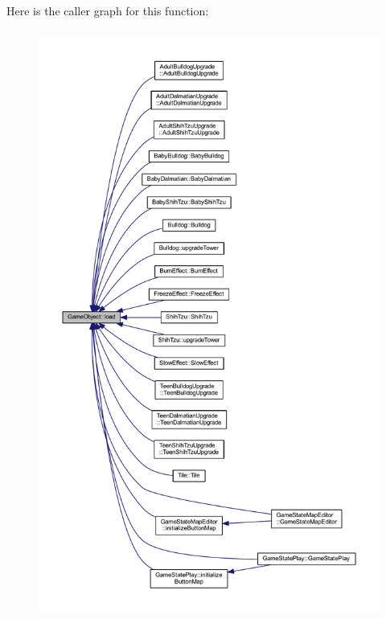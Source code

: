 Here is the caller graph for this function\+:
\nopagebreak
\begin{figure}[H]
\begin{center}
\leavevmode
\includegraphics[height=550pt]{class_game_object_acc593e5b75a58c4a59ad59da654ce807_icgraph}
\end{center}
\end{figure}


